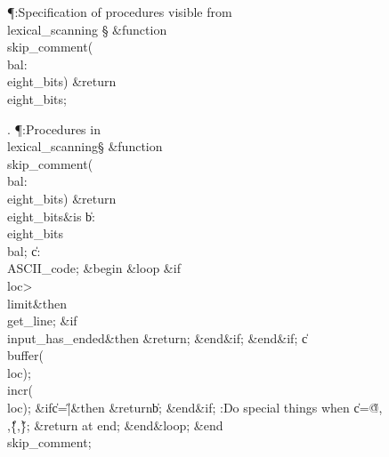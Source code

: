 \Y\P\?\4:Specification of procedures visible from \\{lexical\_scanning}\X%
\mathrel{+}\S\?\6
\&{function}\8\1\\{skip\_comment}\?(\1\?\\{bal}\?:\?\\{eight\_bits}\?\2)%
\&{return}\?\8\\{eight\_bits}\2;\par
\fi

. \P\?:Procedures in \\{lexical\_scanning}\X\mathrel{+}\S\?\6
\&{function}\8\1\\{skip\_comment}\?(\1\?\\{bal}\?:\?\\{eight\_bits}\?\2)%
\&{return}\?\8\\{eight\_bits}\2\8\&{is}\8\1\6
\|b\?:\?\\{eight\_bits}\?\K\?\\{bal};\6
\|c\?:\?\\{ASCII\_code};\6
\4\&{begin}\6
\1\&{loop}\6
\&{if}\1\1\8\\{loc}\?>\?\\{limit}\2\8\&{then}\6
\\{get\_line};\6
\&{if}\1\1\8\\{input\_has\_ended}\2\8\&{then}\6
\?\&{return}\?;\2\6
\&{end}\8\2\&{if}\1;\2\6
\&{end}\8\2\&{if}\1;\6
\|c\?\K\?\\{buffer}\?\1(\?\\{loc}\?\2)\?;\5
\\{incr}\?\1(\?\\{loc}\?\2)\?;\6
\&{if}\1\1\8\|c\?=\?\H{|}\2\8\&{then}\6
\?\&{return}\?\8\|b;\2\6
\&{end}\8\2\&{if}\1;\6
:Do special things when \|c\?=\?\H{@}\?,\?\H{\\}\?,\?\H{\{}\?,\?\H{\}}; %
\&{return} at end\X;\2\6
\&{end}\8\&{loop};\2\6
\&{end}\8\\{skip\_comment};\par
\fi

